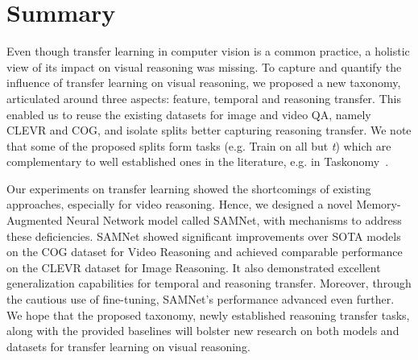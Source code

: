 \section{Summary}


Even though transfer learning in computer vision is a common practice, a holistic view of its impact on visual reasoning was missing.
To capture and quantify the influence of transfer learning on visual reasoning, we proposed a new taxonomy, articulated around three aspects: feature, temporal and reasoning transfer.  This enabled us to reuse the existing datasets for image and video QA, namely CLEVR and COG, and isolate splits better capturing reasoning transfer.
We note that some of the proposed splits form tasks (e.g. Train on all but \textit{t}) which are complementary to well established ones in the literature, e.g. in Taskonomy~\cite{zamir2018taskonomy}.

Our experiments on transfer learning showed the shortcomings of existing approaches, especially for video reasoning.  Hence, we designed a novel Memory-Augmented Neural Network model called SAMNet, with mechanisms to address these deficiencies.
SAMNet showed significant improvements over SOTA models on the COG dataset for Video Reasoning  and achieved comparable performance on the CLEVR dataset for Image Reasoning.
It also demonstrated excellent generalization capabilities for temporal and reasoning transfer. Moreover, through the cautious use of fine-tuning, SAMNet's performance advanced even further.
We hope that the proposed taxonomy, newly established reasoning transfer tasks, along with the provided baselines will bolster new research on both models and datasets for transfer learning on visual reasoning.
